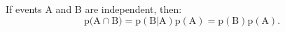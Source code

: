 If events A and B are independent, then:
\[ \mathrm{p(A} \cap \mathrm{B)} = \mathrm{p(B|A)p(A) = p(B)p(A)} . \]